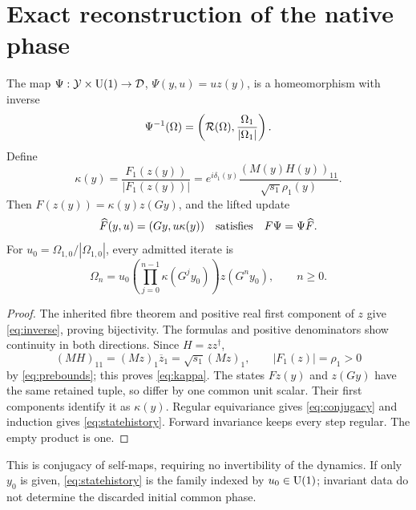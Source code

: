 \section{Exact reconstruction of the native phase}\label{sec:reconstruction}

\begin{theorem}\label{thm:reconstruction}
The map \(\Psi:\mathcal Y\times\mathrm U(1)\to\mathcal D\), \(\Psi(y,u)=uz(y)\), is a homeomorphism with inverse
\begin{equation}
\Psi^{-1}(\Omega)=\left(\mathcal R(\Omega),\frac{\Omega_1}{|\Omega_1|}\right).
\label{eq:inverse}
\end{equation}
Define
\begin{equation}
\kappa(y)=\frac{F_1(z(y))}{|F_1(z(y))|}
=e^{i\delta_1(y)}\frac{(M(y)H(y))_{11}}{\sqrt{s_1}\rho_1(y)}.
\label{eq:kappa}
\end{equation}
Then \(F(z(y))=\kappa(y)z(Gy)\), and the lifted update
\begin{equation}
\widehat F(y,u)=(Gy,u\kappa(y))
\quad\hbox{satisfies}\quad F\Psi=\Psi\widehat F.
\label{eq:conjugacy}
\end{equation}
For \(u_0=\Omega_{1,0}/|\Omega_{1,0}|\), every admitted iterate is
\begin{equation}
\boxed{\Omega_n=u_0\left(\prod_{j=0}^{n-1}\kappa(G^jy_0)\right)z(G^ny_0),
\qquad n\ge0.}
\label{eq:statehistory}
\end{equation}
\end{theorem}
\begin{proof}
The inherited fibre theorem and positive real first component of \(z\) give \eqref{eq:inverse}, proving bijectivity. The formulas and positive denominators show continuity in both directions. Since \(H=zz^\dagger\),
\[
(MH)_{11}=(Mz)_1\overline z_1=\sqrt{s_1}(Mz)_1,
\qquad |F_1(z)|=\rho_1>0
\]
by \eqref{eq:prebounds}; this proves \eqref{eq:kappa}. The states \(Fz(y)\) and \(z(Gy)\) have the same retained tuple, so differ by one common unit scalar. Their first components identify it as \(\kappa(y)\). Regular equivariance gives \eqref{eq:conjugacy} and induction gives \eqref{eq:statehistory}. Forward invariance keeps every step regular. The empty product is one.
\end{proof}

This is conjugacy of self-maps, requiring no invertibility of the dynamics. If only \(y_0\) is given, \eqref{eq:statehistory} is the family indexed by \(u_0\in\mathrm U(1)\); invariant data do not determine the discarded initial common phase.

